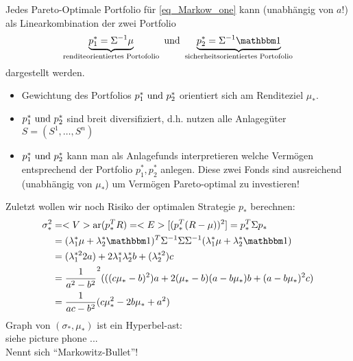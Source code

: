 \begin{conclusion}
	Jedes Pareto-Optimale Portfolio für \eqref{eq_Markow_one} kann (unabhängig von $a$!) als Linearkombination der zwei Portfolio
	\begin{align*}
		\underbrace{p^{\ast}_1 = \Sigma^{-1}\mu}_{\text{renditeorientiertes Portofolio}} \und \underbrace{p_2^{\ast} = \Sigma^{-1}\indi}_{\text{sicherheitsorientiertes Portofolio}}
	\end{align*}
	dargestellt werden.
\end{conclusion}
\begin{*remark}
	\begin{itemize}
		\item Gewichtung des Portfolios $p^{\ast}_1 \text{ und } p_2^{\ast}$ orientiert sich am Renditeziel $\mu_{\ast}$.
		\item $p^{\ast}_1 \text{ und } p_2^{\ast}$ sind breit diversifiziert, d.h. nutzen alle Anlagegüter $S = (S^1, \dots, S^n)$
		\item $p^{\ast}_1 \text{ und } p_2^{\ast}$ kann man als Anlagefunds interpretieren welche Vermögen entsprechend der Portfolio $p^{\ast}_1, p^{\ast}_2$ anlegen. Diese zwei Fonds sind ausreichend (unabhängig von $\mu_{\ast}$) um Vermögen Pareto-optimal zu investieren!
	\end{itemize}
\end{*remark}
Zuletzt wollen wir noch Risiko der optimalen Strategie $p_{\ast}$ berechnen:
\begin{align*}
	\sigma_{\ast}^2 &= \Var(p_{\ast}^T R) = \E[(p_{\ast}^T (R-\mu))^2] = p_{\ast}^T \Sigma p_{\ast}\\
	&= (\lambda_1^{\ast}\mu + \lambda_2^{\ast}\indi)^T \Sigma^{-1}\Sigma\Sigma^{-1}(\lambda_1^{\ast}\mu + \lambda_2^{\ast}\indi)\\
	&= (\lambda_1^{\ast 2}2 a) + 2 \lambda_1^{\ast}\lambda_2^{\ast} b + (\lambda_2^{\ast 2})c\\
	&= \frac{1}{a^2-b^2}^2 (((c\mu_{\ast} -b)^2)a + 2(\mu_{\ast} - b)(a-b \mu_{\ast})b + (a - b\mu_{\ast})^2c)\\
	&= \frac{1}{ac-b^2}(c \mu_{\ast}^2 - 2b\mu_{\ast} +a^2)
\end{align*}
Graph von $(\sigma_{\ast}, \mu_{\ast})$ ist ein Hyperbel-ast:\\
siehe picture phone ...\\
Nennt sich ``Markowitz-Bullet''!
